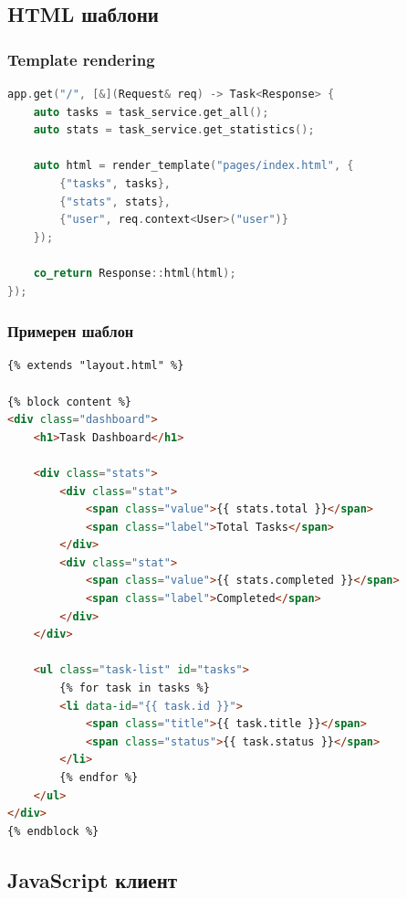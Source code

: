 \subsection{HTML шаблони}

\subsubsection{Template rendering}

\begin{lstlisting}[language=C++, basicstyle=\small\ttfamily, caption={Template rendering}]
app.get("/", [&](Request& req) -> Task<Response> {
    auto tasks = task_service.get_all();
    auto stats = task_service.get_statistics();
    
    auto html = render_template("pages/index.html", {
        {"tasks", tasks},
        {"stats", stats},
        {"user", req.context<User>("user")}
    });
    
    co_return Response::html(html);
});
\end{lstlisting}

\subsubsection{Примерен шаблон}

\begin{lstlisting}[language=HTML, basicstyle=\small\ttfamily, caption={Dashboard template}]
{% extends "layout.html" %}

{% block content %}
<div class="dashboard">
    <h1>Task Dashboard</h1>
    
    <div class="stats">
        <div class="stat">
            <span class="value">{{ stats.total }}</span>
            <span class="label">Total Tasks</span>
        </div>
        <div class="stat">
            <span class="value">{{ stats.completed }}</span>
            <span class="label">Completed</span>
        </div>
    </div>
    
    <ul class="task-list" id="tasks">
        {% for task in tasks %}
        <li data-id="{{ task.id }}">
            <span class="title">{{ task.title }}</span>
            <span class="status">{{ task.status }}</span>
        </li>
        {% endfor %}
    </ul>
</div>
{% endblock %}
\end{lstlisting}

\subsection{JavaScript клиент}

